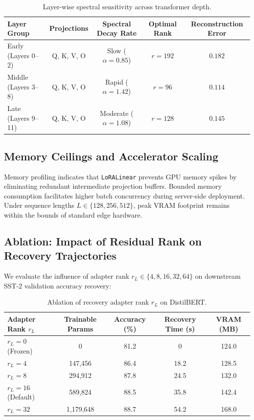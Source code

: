 \begin{table}[H]
\centering
\small
\begin{tabular}{lcccc}
\toprule
\textbf{Layer Group} & \textbf{Projections} & \textbf{Spectral Decay Rate} & \textbf{Optimal Rank} & \textbf{Reconstruction Error} \\
\midrule
Early (Layers 0--2) & Q, K, V, O & Slow ($\alpha = 0.85$) & $r=192$ & $0.182$ \\
Middle (Layers 3--8) & Q, K, V, O & Rapid ($\alpha = 1.42$) & $r=96$ & $0.114$ \\
Late (Layers 9--11) & Q, K, V, O & Moderate ($\alpha = 1.08$) & $r=128$ & $0.145$ \\
\bottomrule
\end{tabular}
\caption{Layer-wise spectral sensitivity across transformer depth.}
\label{tab:layer_sensitivity}
\end{table}

\subsection{Memory Ceilings and Accelerator Scaling}
Memory profiling indicates that \texttt{LoRALinear} prevents GPU memory spikes by eliminating redundant intermediate projection buffers. Bounded memory consumption facilitates higher batch concurrency during server-side deployment. Under sequence lengths $L \in \{128, 256, 512\}$, peak VRAM footprint remains within the bounds of standard edge hardware.

\subsection{Ablation: Impact of Residual Rank on Recovery Trajectories}
We evaluate the influence of adapter rank $r_L \in \{4, 8, 16, 32, 64\}$ on downstream SST-2 validation accuracy recovery:
\begin{table}[H]
\centering
\small
\begin{tabular}{lcccc}
\toprule
\textbf{Adapter Rank $r_L$} & \textbf{Trainable Params} & \textbf{Accuracy (\%)} & \textbf{Recovery Time (s)} & \textbf{VRAM (MB)} \\
\midrule
$r_L = 0$ (Frozen) & 0 & 81.2 & 0 & 124.0 \\
$r_L = 4$ & 147,456 & 86.4 & 18.2 & 128.5 \\
$r_L = 8$ & 294,912 & 87.8 & 24.5 & 132.0 \\
$r_L = 16$ (Default) & 589,824 & 88.5 & 35.8 & 142.4 \\
$r_L = 32$ & 1,179,648 & 88.7 & 54.2 & 168.0 \\
\bottomrule
\end{tabular}
\caption{Ablation of recovery adapter rank $r_L$ on DistilBERT.}
\label{tab:ablation_adapter_rank}
\end{table}

